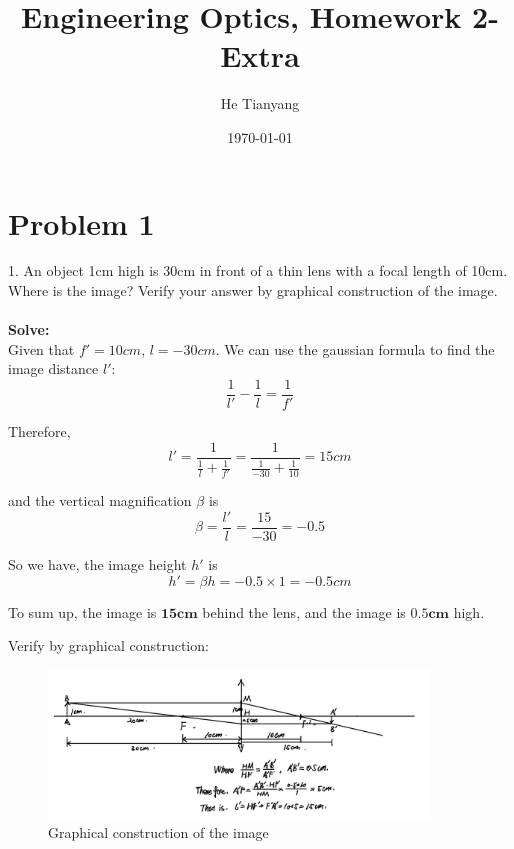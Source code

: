 \documentclass{article}
\title{Engineering Optics, Homework 2-Extra}
\author{He Tianyang}
\date{\today}
\begin{document}
\maketitle

\section{Problem 1}

1. An object 1cm high is 30cm in front of a thin lens with a focal length of 10cm. Where is the image? Verify your answer by graphical construction of the image.\\\\
\textbf{Solve:}\\

Given that $f' = 10cm$, $l = -30cm$. We can use the gaussian formula to find the image distance $l'$:
\begin{equation}
    \frac{1}{l'}-\frac{1}{l} = \frac{1}{f'}
\end{equation}

Therefore,
\begin{equation}
    l' = \frac{1}{\frac{1}{l} + \frac{1}{f'}} = \frac{1}{\frac{1}{-30} + \frac{1}{10}} = 15cm
\end{equation}

and the vertical magnification $\beta$ is
\begin{equation}
    \beta = \frac{l'}{l} = \frac{15}{-30} = -0.5
\end{equation}

So we have, the image height $h'$ is
\begin{equation}
    h' = \beta h = -0.5 \times 1 = -0.5cm
\end{equation}

To sum up, the image is $\mathbf{15cm}$ behind the lens,
and the image is $\mathbf{0.5cm}$ high.

Verify by graphical construction:
\begin{figure}[H]
    \centering
    \includegraphics[width=0.9\textwidth]{./image/hw2/hw2e_1.jpeg}
    \caption{Graphical construction of the image}
\end{figure}
\end{document}
